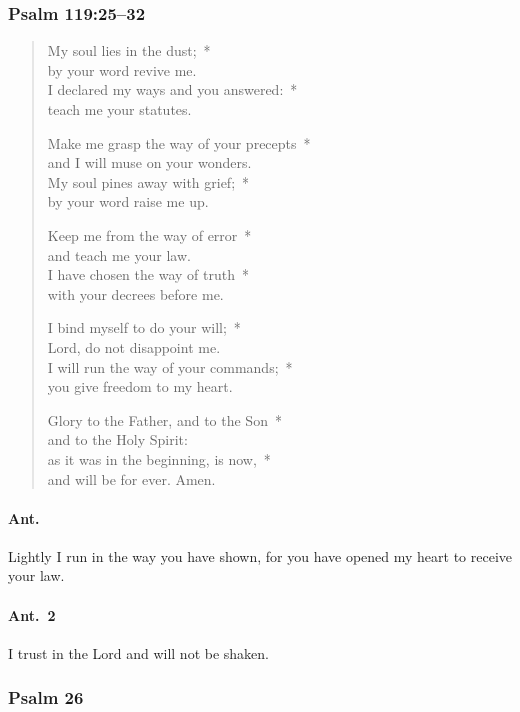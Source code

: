 \documentclass[12pt,twocolumn,letterpaper]{book}
\begin{document}
\subsubsection*{Psalm 119:25--32}
\begin{verse}
My soul lies in the dust;~*\\
by your word revive me.\\
I declared my ways and you answered:~*\\
teach me your statutes.

Make me grasp the way of your precepts~*\\
and I will muse on your wonders.\\
My soul pines away with grief;~*\\
by your word raise me up.

Keep me from the way of error~*\\
and teach me your law.\\
I have chosen the way of truth~*\\
with your decrees before me.

I bind myself to do your will;~*\\
Lord, do not disappoint me.\\
I will run the way of your commands;~*\\
you give freedom to my heart.

Glory to the Father, and to the Son~*\\
and to the Holy Spirit:\\
as it was in the beginning, is now,~*\\
and will be for ever. Amen.
\end{verse}

\paragraph{Ant.}{Lightly I run in the way you have shown, for you have opened my heart to receive your law.}

\paragraph{Ant.\ 2}{I trust in the Lord and will not be shaken.}

\subsubsection*{Psalm 26}
\end{document}
